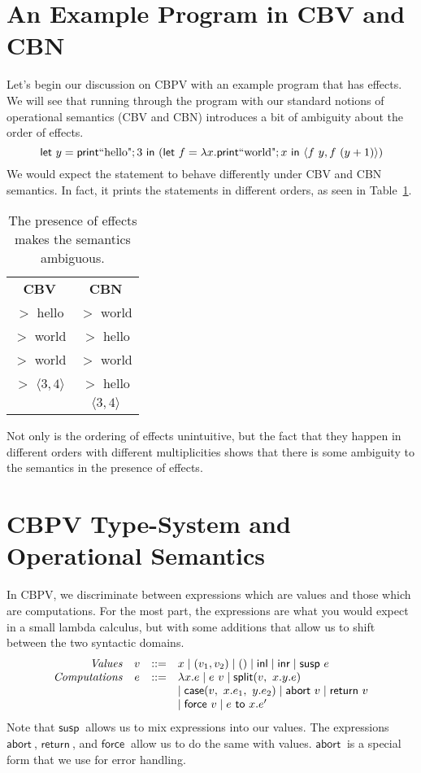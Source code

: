 \documentclass{article}
\newcommand{\letexp}[3]{\mathsf{let}~#1=#2~\mathsf{in}~#3}
\newcommand{\printexp}{\mathsf{print}}
\newcommand{\stringexp}[1]{\text{``#1"}}
\newcommand{\exsusp}[1]{\mathsf{susp}~#1}
\newcommand{\exabort}[1]{\mathsf{abort}~#1}
\newcommand{\exreturn}[1]{\mathsf{return}~#1}
\newcommand{\exforce}[1]{\mathsf{force}~#1}
\newcommand{\exto}[2]{#1~\mathsf{to}~#2}
\begin{document}
\section{An Example Program in CBV and CBN}
Let's begin our discussion on CBPV with an example program that has effects. We will see that running through the program with our standard notions of operational semantics (CBV and CBN) introduces a bit of ambiguity about the order of effects.
\[
    \letexp{y}{\printexp \stringexp{hello}; 3}{(
    \letexp{f}{\exfun{x}.\printexp \stringexp{world}; x}{\langle f~y, f~(y + 1) \rangle}
    )}
\]
We would expect the statement to behave differently under CBV and CBN semantics. In fact, it prints the statements in different orders, as seen in Table~\ref{tab:cbv-vs-cbn}.
\begin{table}[]
    \centering
    \begin{tabular}{c|c}
         \textbf{CBV} & \textbf{CBN}  \\
         $>$ hello & $>$ world \\
         $>$ world & $>$ hello \\
         $>$ world & $>$ world \\
         $>$ $\langle 3 , 4 \rangle$ & $>$ hello \\
         & $\langle 3 , 4 \rangle$
    \end{tabular}
    \caption{The presence of effects makes the semantics ambiguous.}
    \label{tab:cbv-vs-cbn}
\end{table}
Not only is the ordering of effects unintuitive, but the fact that they happen in different orders with different multiplicities shows that there is some ambiguity to the semantics in the presence of effects.

\section{CBPV Type-System and Operational Semantics}
In CBPV, we discriminate between expressions which are values and those which are computations. For the most part, the expressions are what you would expect in a small lambda calculus, but with some additions that allow us to shift between the two syntactic domains.
\[
    \begin{array}{rccl}
         \mathit{Values} & v & ::= & x \mid \expair{v_1, v_2} \mid \expair{} \mid \exinl{v} \mid \exinr{v} \mid \exsusp{e}  \\
         \mathit{Computations} & e & ::= & \exlam{x}.e \mid e~v \mid \exsplit{v,~x.y.e} \\ 
         & & & \mid \excase{v,~x.e_1,~y.e_2} \mid \exabort{v} \mid \exreturn{v} \\
         & & & \mid \exforce{v} \mid \exto{e}{x.e'} 
    \end{array}
\]
Note that $\exsusp{}$ allows us to mix expressions into our values. The expressions $\exabort{}$, $\exreturn{}$, and $\exforce{}$ allow us to do the same with values. $\exabort{}$ is a special form that we use for error handling.
\end{document}
